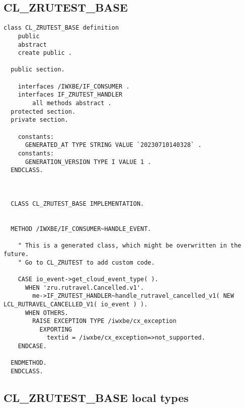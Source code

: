 \subsection{ CL\_ZRUTEST\_BASE } 

\begin{Verbatim}[breaklines=true]
    class CL_ZRUTEST_BASE definition
    public
    abstract
    create public .
  
  public section.
  
    interfaces /IWXBE/IF_CONSUMER .
    interfaces IF_ZRUTEST_HANDLER
        all methods abstract .
  protected section.
  private section.
  
    constants:
      GENERATED_AT TYPE STRING VALUE `20230710140328` .
    constants:
      GENERATION_VERSION TYPE I VALUE 1 .
  ENDCLASS.
  
  
  
  CLASS CL_ZRUTEST_BASE IMPLEMENTATION.
  
  
  METHOD /IWXBE/IF_CONSUMER~HANDLE_EVENT.
  
    " This is a generated class, which might be overwritten in the future.
    " Go to CL_ZRUTEST to add custom code.
  
    CASE io_event->get_cloud_event_type( ).
      WHEN 'zru.rutravel.Cancelled.v1'.
        me->IF_ZRUTEST_HANDLER~handle_rutravel_cancelled_v1( NEW LCL_RUTRAVEL_CANCELLED_V1( io_event ) ).
      WHEN OTHERS.
        RAISE EXCEPTION TYPE /iwxbe/cx_exception
          EXPORTING
            textid = /iwxbe/cx_exception=>not_supported.
    ENDCASE.
  
  ENDMETHOD.
  ENDCLASS.
\end{Verbatim}

\subsection{ CL\_ZRUTEST\_BASE local types} 

